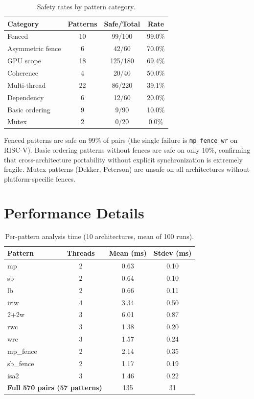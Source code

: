 \documentclass[10pt]{article}
\begin{document}
\begin{table}[h]
\centering
\caption{Safety rates by pattern category.}
\label{tab:categories}
\begin{tabular}{lccc}
\toprule
\textbf{Category} & \textbf{Patterns} & \textbf{Safe/Total} & \textbf{Rate} \\
\midrule
Fenced & 10 & 99/100 & 99.0\% \\
Asymmetric fence & 6 & 42/60 & 70.0\% \\
GPU scope & 18 & 125/180 & 69.4\% \\
Coherence & 4 & 20/40 & 50.0\% \\
Multi-thread & 22 & 86/220 & 39.1\% \\
Dependency & 6 & 12/60 & 20.0\% \\
Basic ordering & 9 & 9/90 & 10.0\% \\
Mutex & 2 & 0/20 & 0.0\% \\
\bottomrule
\end{tabular}
\end{table}

Fenced patterns are safe on 99\% of pairs (the single failure is
\texttt{mp\_fence\_wr} on RISC-V). Basic ordering patterns without
fences are safe on only 10\%, confirming that cross-architecture
portability without explicit synchronization is extremely fragile.
Mutex patterns (Dekker, Peterson) are unsafe on all architectures
without platform-specific fences.

\section{Performance Details}
\label{app:performance}

\begin{table}[h]
\centering
\caption{Per-pattern analysis time (10 architectures, mean of 100 runs).}
\label{tab:perf-detail}
\begin{tabular}{lccc}
\toprule
\textbf{Pattern} & \textbf{Threads} & \textbf{Mean (ms)} & \textbf{Stdev (ms)} \\
\midrule
mp & 2 & 0.63 & 0.10 \\
sb & 2 & 0.64 & 0.10 \\
lb & 2 & 0.66 & 0.11 \\
iriw & 4 & 3.34 & 0.50 \\
2+2w & 3 & 6.01 & 0.87 \\
rwc & 3 & 1.38 & 0.20 \\
wrc & 3 & 1.57 & 0.24 \\
mp\_fence & 2 & 2.14 & 0.35 \\
sb\_fence & 2 & 1.17 & 0.19 \\
isa2 & 3 & 1.46 & 0.22 \\
\midrule
\multicolumn{2}{l}{\textbf{Full 570 pairs (57 patterns)}} & 135 & 31 \\
\bottomrule
\end{tabular}
\end{table}
\end{document}
